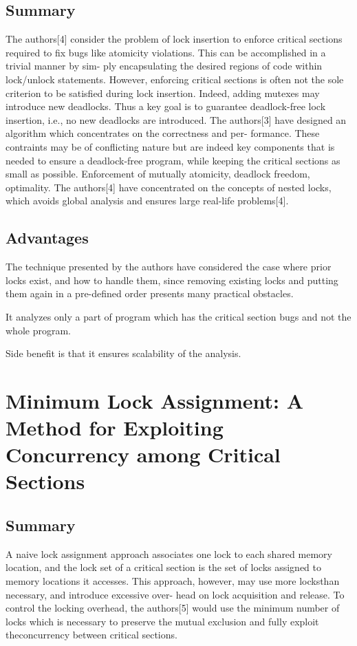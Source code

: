 \subsection{Summary}

The authors[4] consider the problem of lock insertion to enforce critical sections required to fix bugs like atomicity violations. This can be accomplished in a trivial manner by sim- ply encapsulating the desired regions of code within lock/unlock statements. However, enforcing critical sections is often not the sole criterion to be satisfied during lock insertion. Indeed, adding mutexes may introduce new deadlocks. Thus a key goal is to guarantee deadlock-free lock insertion, i.e., no new deadlocks are introduced.
The authors[3] have designed an algorithm which concentrates on the correctness and per- formance. These contraints may be of conflicting nature but are indeed key components that is needed to ensure a deadlock-free program, while keeping the critical sections as small as possible. Enforcement of mutually atomicity, deadlock freedom, optimality. The authors[4] have concentrated on the concepts of nested locks, which avoids global analysis and ensures large real-life problems[4].

\subsection{Advantages}

The technique presented by the authors have considered the case where prior locks exist, and how to handle them, since removing existing locks and putting them again in a pre-defined order presents many practical obstacles.

It analyzes only a part of program which has the critical section bugs and not the whole program.

Side benefit is that it ensures scalability of the analysis.

\section{Minimum Lock Assignment: A Method for Exploiting Concurrency among Critical Sections}

\subsection{Summary}

A naive lock assignment approach associates one lock to each shared memory location, and the lock set of a critical section is the set of locks assigned to memory locations it accesses. This approach, however, may use more locksthan necessary, and introduce excessive over- head on lock acquisition and release. To control the locking overhead, the authors[5] would use the minimum number of locks which is necessary to preserve the mutual exclusion and fully exploit theconcurrency between critical sections.

